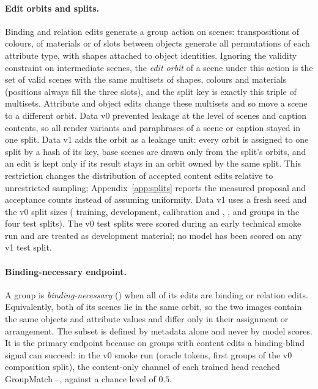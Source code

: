 \paragraph{Edit orbits and splits.}
Binding and relation edits generate a group action on scenes: transpositions of colours, of
materials or of slots between objects generate all permutations of each attribute type, with shapes
attached to object identities. Ignoring the validity constraint on intermediate scenes, the
\emph{edit orbit} of a scene under this action is the set of valid scenes with the same multisets
of shapes, colours and materials (positions always fill the three slots), and the split key is
exactly this triple of multisets. Attribute and object edits change these multisets and so move a scene to a
different orbit. Data v0 prevented leakage at the level of scenes and caption contents, so all
render variants and paraphrases of a scene or caption stayed in one split. Data v1 adds the orbit
as a leakage unit: every orbit is assigned to one split by a hash of its key, base scenes are drawn
only from the split's orbits, and an edit is kept only if its result stays in an orbit owned by the
same split. This restriction changes the distribution of accepted content edits relative to
unrestricted sampling; Appendix~\ref{app:splits} reports the measured proposal and acceptance
counts instead of assuming uniformity. Data v1 uses a fresh seed and the v0 split sizes
(\DVnTrain{} training, \DVnDev{} development, \DVnCalib{} calibration and \DVnTestIid{},
\DVnTestHeldoutPairs{}, \DVnTestComposition{} and \DVnTestHeldoutTemplate{} groups in the four test
splits). The v0 test splits were scored during an early technical smoke run and are treated as
development material; no model has been scored on any v1 test split.

\paragraph{Binding-necessary endpoint.}
A group is \emph{binding-necessary} (\bn) when all of its edits are binding or relation edits.
Equivalently, both of its scenes lie in the same orbit, so the two images contain the same objects
and attribute values and differ only in their assignment or arrangement. The subset is defined by
metadata alone and never by model scores. It is the primary endpoint because on groups with content
edits a binding-blind signal can succeed: in the v0 smoke run (oracle tokens, first \SMevalCap{} groups of
the v0 composition split), the content-only channel of each trained head reached GroupMatch
\SMcontentMatchMin--\SMcontentMatchMax{}, against a chance level of $0.5$.

